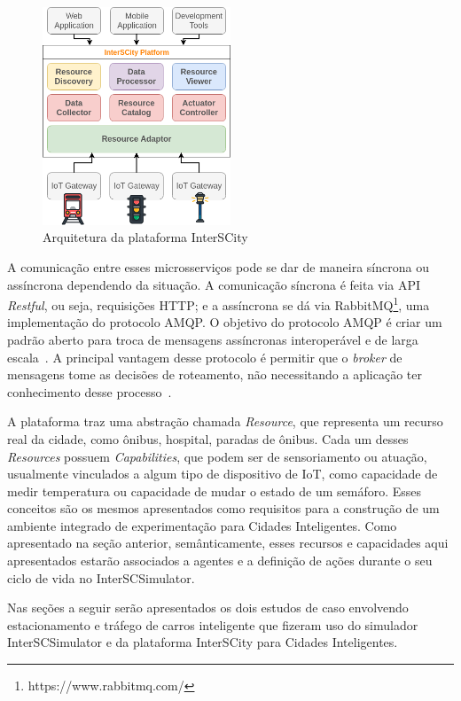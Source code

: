 \begin{figure}[ht]
	\centering
	\includegraphics[width=0.5\textwidth]{figuras/platform_architecture.png}
	\caption{Arquitetura da plataforma InterSCity}
	\label{fig:platform_architecture}
\end{figure}

A comunicação entre esses microsserviços pode se dar de maneira síncrona ou assíncrona dependendo da situação.
A comunicação síncrona é feita via API \textit{Restful}, ou seja, requisições HTTP; e a assíncrona se dá via RabbitMQ\footnote{https://www.rabbitmq.com/}, uma implementação do protocolo AMQP.
O objetivo do protocolo AMQP é criar um padrão aberto para troca de mensagens assíncronas interoperável e de larga escala~\cite{vinoski_2006}.
A principal vantagem desse protocolo é permitir que o \textit{broker} de mensagens tome as decisões de roteamento, não necessitando a aplicação ter conhecimento
desse processo~\cite{vinoski_2006}.

A plataforma traz uma abstração chamada \textit{Resource}, que representa um recurso real da cidade, como ônibus, hospital, paradas de ônibus.
Cada um desses \textit{Resources} possuem \textit{Capabilities}, que podem ser de sensoriamento ou atuação, usualmente vinculados a algum tipo de dispositivo de IoT,
como capacidade de medir temperatura ou capacidade de mudar o estado de um semáforo.
Esses conceitos são os mesmos apresentados como requisitos para a construção de um ambiente integrado de experimentação para Cidades Inteligentes.
Como apresentado na seção anterior, semânticamente, esses recursos e capacidades aqui apresentados estarão associados a agentes e a definição de ações durante o seu
ciclo de vida no InterSCSimulator.

Nas seções a seguir serão apresentados os dois estudos de caso envolvendo estacionamento e tráfego de carros inteligente que fizeram uso do simulador InterSCSimulator e da plataforma InterSCity
para Cidades Inteligentes.

